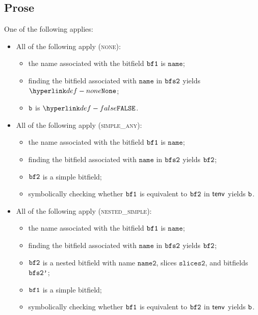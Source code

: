 \documentclass{book}
\newcommand\nametwo[0]{\texttt{name2}}
\newcommand\slicestwo[0]{\texttt{slices2}}
\newcommand\name[0]{\texttt{name}}
\begin{document}
\subsection{Prose}
One of the following applies:
\begin{itemize}
  \item All of the following apply (\textsc{none}):
  \begin{itemize}
    \item the name associated with the bitfield $\texttt{bf1}$ is $\name$;
    \item finding the bitfield associated with $\name$ in $\texttt{bfs2}$ yields $\None$;
    \item $\texttt{b}$ is $\False$.
  \end{itemize}

  \item All of the following apply (\textsc{simple\_any}):
  \begin{itemize}
    \item the name associated with the bitfield $\texttt{bf1}$ is $\name$;
    \item finding the bitfield associated with $\name$ in $\texttt{bfs2}$ yields $\texttt{bf2}$;
    \item $\texttt{bf2}$ is a simple bitfield;
    \item symbolically checking whether $\texttt{bf1}$ is equivalent to $\texttt{bf2}$ in $\textsf{tenv}$ yields $\texttt{b}$.
  \end{itemize}

  \item All of the following apply (\textsc{nested\_simple}):
  \begin{itemize}
    \item the name associated with the bitfield $\texttt{bf1}$ is $\name$;
    \item finding the bitfield associated with $\name$ in $\texttt{bfs2}$ yields $\texttt{bf2}$;
    \item $\texttt{bf2}$ is a nested bitfield with name $\nametwo$, slices $\slicestwo$, and bitfields $\texttt{bfs2'}$;
    \item $\texttt{bf1}$ is a simple bitfield;
    \item symbolically checking whether $\texttt{bf1}$ is equivalent to $\texttt{bf2}$ in $\textsf{tenv}$ yields $\texttt{b}$.
  \end{itemize}


\end{itemize}
\end{document}
